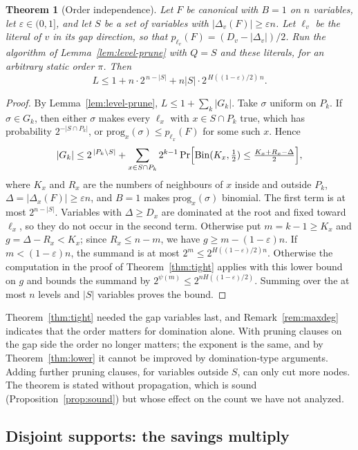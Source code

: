 \documentclass[11pt,a4paper]{article}
\newtheorem{theorem}{Theorem}
\theoremstyle{remark}
\begin{document}
\begin{theorem}[Order independence]\label{thm:orderfree}
Let $F$ be canonical with $B=1$ on $n$ variables, let $\varepsilon\in(0,1]$, and
let $S$ be a set of variables with $|\Delta_v(F)|\ge\varepsilon n$. Let $\ell_v$
be the literal of $v$ in its gap direction, so that
$p_{\ell_v}(F)=(D_v-|\Delta_v|)/2$. Run the algorithm of
Lemma~\ref{lem:level-prune} with $Q=S$ and these literals, for an
\emph{arbitrary} static order $\pi$. Then
\[
 L\le1+n\cdot2^{\,n-|S|}+n|S|\cdot2^{\,H((1-\varepsilon)/2)\,n}.
\]
\end{theorem}

\begin{proof}
By Lemma~\ref{lem:level-prune}, $L\le1+\sum_k|G_k|$. Take $\sigma$ uniform on
$P_k$. If $\sigma\in G_k$, then either $\sigma$ makes every $\ell_x$ with
$x\in S\cap P_k$ true, which has probability $2^{-|S\cap P_k|}$, or
$\mathrm{prog}_x(\sigma)\le p_{\ell_x}(F)$ for some such $x$. Hence
\[
 |G_k|\le2^{\,|P_k\setminus S|}+\sum_{x\in S\cap P_k}2^{k-1}
 \Pr\Bigl[\mathrm{Bin}(K_x,\tfrac12)\le\tfrac{K_x+R_x-\Delta}{2}\Bigr],
\]
where $K_x$ and $R_x$ are the numbers of neighbours of $x$ inside and outside
$P_k$, $\Delta=|\Delta_x(F)|\ge\varepsilon n$, and $B=1$ makes
$\mathrm{prog}_x(\sigma)$ binomial. The first term is at most $2^{n-|S|}$.
Variables with $\Delta\ge D_x$ are dominated at the root and fixed toward
$\ell_x$, so they do not occur in the second term. Otherwise put $m=k-1\ge K_x$
and $g=\Delta-R_x<K_x$; since $R_x\le n-m$, we have $g\ge m-(1-\varepsilon)n$.
If $m<(1-\varepsilon)n$, the summand is at most
$2^m\le2^{H((1-\varepsilon)/2)n}$. Otherwise the computation in the proof of
Theorem~\ref{thm:tight} applies with this lower bound on $g$ and bounds the
summand by $2^{\psi(m)}\le2^{nH((1-\varepsilon)/2)}$. Summing over the at most
$n$ levels and $|S|$ variables proves the bound.
\end{proof}

Theorem~\ref{thm:tight} needed the gap variables last, and
Remark~\ref{rem:maxdeg} indicates that the order matters for domination alone.
With pruning clauses on the gap side the order no longer matters; the exponent
is the same, and by Theorem~\ref{thm:lower} it cannot be improved by
domination-type arguments. Adding further pruning clauses, for variables
outside $S$, can only cut more nodes. The theorem is stated without
propagation, which is sound (Proposition~\ref{prop:sound}) but whose effect on
the count we have not analyzed.

\subsection{Disjoint supports: the savings multiply}
\end{document}

